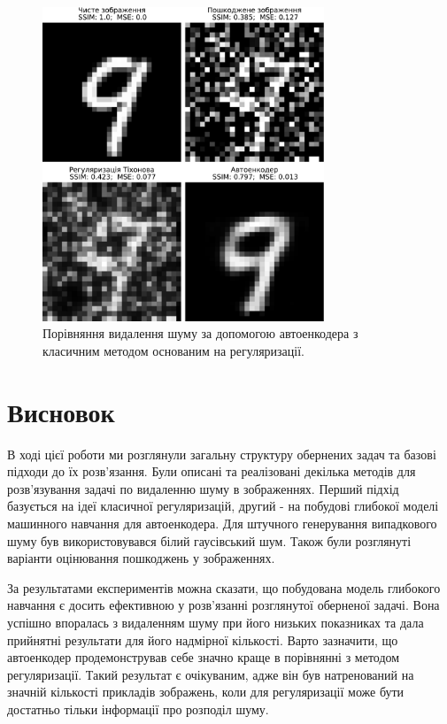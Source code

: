 \documentclass[14pt,a4paper]{extarticle}
\newcounter{e}
\numberwithin{equation}{section}
\numberwithin{figure}{section}
\begin{document}
	\begin{figure}[H]
		\centering
		\includegraphics[width=0.75\textwidth]{../resources/denoising-methods-comparation.pdf}
		\caption{Порівняння видалення шуму за допомогою автоенкодера з класичним методом основаним на регуляризації.}
		\label{fig:denoising-methods-comparation}
	\end{figure}

	\newpage
	\thispagestyle{empty}
	\section*{Висновок}
	\begin{center}\end{center}
	В ході цієї роботи ми розглянули загальну структуру обернених задач та базові підходи до їх розв'язання. Були описані та реалізовані декілька методів для розв'язування задачі по видаленню шуму в зображеннях. Перший підхід базується на ідеї класичної регуляризацій, другий - на побудові глибокої моделі машинного навчання для автоенкодера. Для штучного генерування випадкового шуму був використовувався білий гаусівський шум. Також були розглянуті варіанти оцінювання пошкоджень у зображеннях.

	За результатами експериментів можна сказати, що побудована модель глибокого навчання є досить ефективною у розв'язанні розглянутої оберненої задачі. Вона успішно впоралась з видаленням шуму при його низьких показниках та дала прийнятні результати для його надмірної кількості. Варто зазначити, що автоенкодер продемонстрував себе значно краще в порівнянні з методом регуляризації. Такий результат є очікуваним, адже він був натренований на значній кількості прикладів зображень, коли для регуляризації може бути достатньо тільки інформації про розподіл шуму.
	
\end{document}
